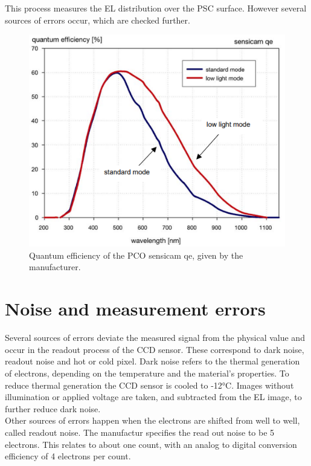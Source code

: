 This process measures the EL distribution over the PSC surface. However several sources of errors occur, which are checked further.
\begin{figure}
	\centering
	\includegraphics[width=\linewidth]{Images/ExperimentalSetup/PCO_sensicam_QE}
	\caption{Quantum efficiency of the PCO sensicam qe, given by the manufacturer.}
	\label{fig:pcosensicamqe}
\end{figure}

\section{Noise and measurement errors}
Several sources of errors deviate the measured signal from the physical value and occur in the readout process of the CCD sensor. These correspond to dark noise, readout noise and hot or cold pixel. Dark noise refers to the thermal generation of electrons, depending on the temperature and the material's properties. To reduce thermal generation the CCD sensor is cooled to -12°C. Images without illumination or applied voltage are taken, and subtracted from the EL image, to further reduce dark noise.\\

Other sources of errors happen when the electrons are shifted from well to well, called readout noise. The manufactur specifies the read out noise to be 5 electrons. This relates to about one count, with an analog to digital conversion efficiency of 4 electrons per count.\cite{ManualSensicam}
 